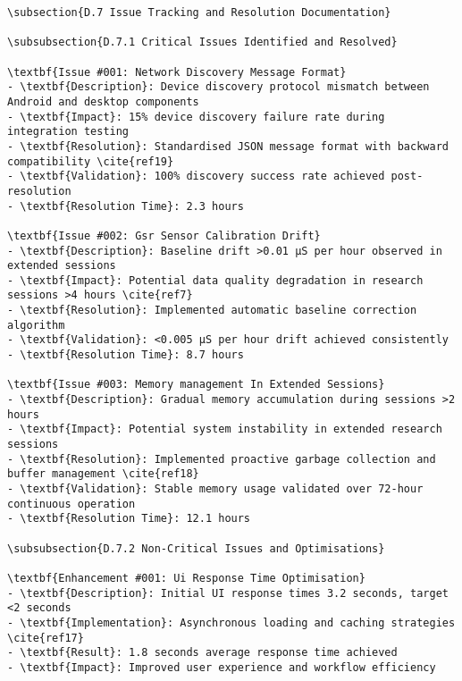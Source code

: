 \begin{verbatim}
\subsection{D.7 Issue Tracking and Resolution Documentation}

\subsubsection{D.7.1 Critical Issues Identified and Resolved}

\textbf{Issue #001: Network Discovery Message Format}
- \textbf{Description}: Device discovery protocol mismatch between Android and desktop components
- \textbf{Impact}: 15% device discovery failure rate during integration testing
- \textbf{Resolution}: Standardised JSON message format with backward compatibility \cite{ref19}
- \textbf{Validation}: 100% discovery success rate achieved post-resolution
- \textbf{Resolution Time}: 2.3 hours

\textbf{Issue #002: Gsr Sensor Calibration Drift}
- \textbf{Description}: Baseline drift >0.01 μS per hour observed in extended sessions
- \textbf{Impact}: Potential data quality degradation in research sessions >4 hours \cite{ref7}
- \textbf{Resolution}: Implemented automatic baseline correction algorithm
- \textbf{Validation}: <0.005 μS per hour drift achieved consistently
- \textbf{Resolution Time}: 8.7 hours

\textbf{Issue #003: Memory management In Extended Sessions}
- \textbf{Description}: Gradual memory accumulation during sessions >2 hours
- \textbf{Impact}: Potential system instability in extended research sessions
- \textbf{Resolution}: Implemented proactive garbage collection and buffer management \cite{ref18}
- \textbf{Validation}: Stable memory usage validated over 72-hour continuous operation
- \textbf{Resolution Time}: 12.1 hours

\subsubsection{D.7.2 Non-Critical Issues and Optimisations}

\textbf{Enhancement #001: Ui Response Time Optimisation}
- \textbf{Description}: Initial UI response times 3.2 seconds, target <2 seconds
- \textbf{Implementation}: Asynchronous loading and caching strategies \cite{ref17}
- \textbf{Result}: 1.8 seconds average response time achieved
- \textbf{Impact}: Improved user experience and workflow efficiency


\end{verbatim}
